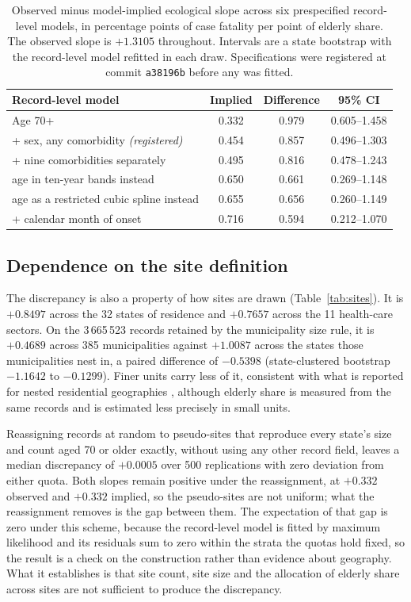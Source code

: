 \documentclass[11pt]{article}
\begin{document}
\begin{table}[t]
\centering
\caption{Observed minus model-implied ecological slope across six
prespecified record-level models, in percentage points of case fatality
per point of elderly share.  The observed slope is $+1.3105$ throughout.
Intervals are a state bootstrap with the record-level model refitted in
each draw.  Specifications were registered at commit \texttt{a38196b}
before any was fitted.}
\label{tab:ladder}
\begin{tabular}{lccc}
\toprule
Record-level model & Implied & Difference & 95\% CI \\
\midrule
Age 70+                                   & 0.332 & 0.979 & 0.605--1.458 \\
\;\;+ sex, any comorbidity \emph{(registered)} & 0.454 & 0.857 & 0.496--1.303 \\
\;\;+ nine comorbidities separately       & 0.495 & 0.816 & 0.478--1.243 \\
\;\;age in ten-year bands instead           & 0.650 & 0.661 & 0.269--1.148 \\
\;\;age as a restricted cubic spline instead & 0.655 & 0.656 & 0.260--1.149 \\
\;\;+ calendar month of onset             & 0.716 & 0.594 & 0.212--1.070 \\
\bottomrule
\end{tabular}
\end{table}

\subsection{Dependence on the site definition}

The discrepancy is also a property of how sites are drawn
(Table~\ref{tab:sites}).  It is $+0.8497$ across the 32 states of
residence and $+0.7657$ across the 11 health-care sectors.  On the
3\,665\,523 records retained by the municipality size rule, it is
$+0.4689$ across 385 municipalities against $+1.0087$ across the states
those municipalities nest in, a paired difference of $-0.5398$
(state-clustered bootstrap $-1.1642$ to $-0.1299$).  Finer units carry
less of it, consistent with what is reported for nested residential
geographies \cite{best2001ecological,lancaster2006reducing}, although
elderly share is measured from the same records and is estimated less
precisely in small units.

Reassigning records at random to pseudo-sites that reproduce every
state's size and count aged 70 or older exactly, without using any other
record field, leaves a median discrepancy of $+0.0005$ over 500
replications with zero deviation from either quota.  Both slopes remain
positive under the reassignment, at $+0.332$ observed and $+0.332$
implied, so the pseudo-sites are not uniform; what the reassignment
removes is the gap between them.  The expectation of that gap is zero
under this scheme, because the record-level model is fitted by maximum
likelihood and its residuals sum to zero within the strata the quotas
hold fixed, so the result is a check on the construction rather than
evidence about geography.  What it establishes is that site count, site
size and the allocation of elderly share across sites are not sufficient
to produce the discrepancy.
\end{document}
